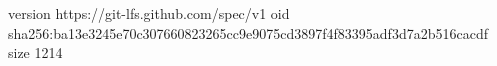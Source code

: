 version https://git-lfs.github.com/spec/v1
oid sha256:ba13e3245e70c307660823265cc9e9075cd3897f4f83395adf3d7a2b516cacdf
size 1214
